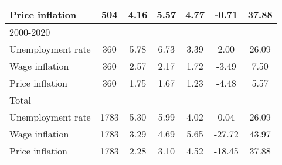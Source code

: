 \begin{table}[htbp]
\begin{tabular}{l*{1}{cccccc}}
Price inflation     &         504&        4.16&        5.57&        4.77&       -0.71&       37.88\\
\hline
2000-2020           &            &            &            &            &            &            \\
Unemployment rate   &         360&        5.78&        6.73&        3.39&        2.00&       26.09\\
Wage inflation      &         360&        2.57&        2.17&        1.72&       -3.49&        7.50\\
Price inflation     &         360&        1.75&        1.67&        1.23&       -4.48&        5.57\\
\hline
Total               &            &            &            &            &            &            \\
Unemployment rate   &        1783&        5.30&        5.99&        4.02&        0.04&       26.09\\
Wage inflation      &        1783&        3.29&        4.69&        5.65&      -27.72&       43.97\\
Price inflation     &        1783&        2.28&        3.10&        4.52&      -18.45&       37.88\\
\hline\hline
\end{tabular}
\end{table}
